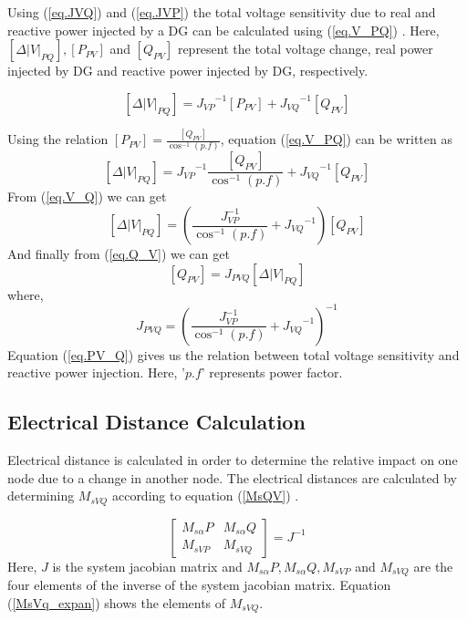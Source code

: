 Using (\ref{eq.JVQ}) and (\ref{eq.JVP}) the total voltage sensitivity due to real and reactive power injected by a DG can be calculated using (\ref{eq.V_PQ}) \cite{Th_ali}. Here, $[\Delta|V|_{PQ}], [P_{PV}] $ and $[Q_{PV}]$ represent the total voltage change, real power injected by DG and reactive power injected by DG, respectively.

\begin{equation}\label{eq.V_PQ}
[\Delta|V|_{PQ}] ={ J_{VP}}^{-1} [P_{PV}]+{ J_{VQ}}^{-1} [Q_{PV}]
\end{equation}

Using the relation $[P_{PV}] = \frac{[Q_{PV}]}{\cos^{-1}(p.f)}$, equation (\ref{eq.V_PQ}) can be written as
\begin{equation}\label{eq.V_Q}
 [\Delta|V|_{PQ}] ={ J_{VP}}^{-1}\frac{[Q_{PV}]}{\cos^{-1}(p.f)} +{ J_{VQ}}^{-1} [Q_{PV}]
\end{equation}
From (\ref{eq.V_Q}) we can get
\begin{equation}\label{eq.Q_V}
 [\Delta|V|_{PQ}] =( \frac{J_{VP}^{-1}}{\cos^{-1}(p.f)} +{ J_{VQ}}^{-1}) [Q_{PV}]
\end{equation}
And finally from (\ref{eq.Q_V}) we can get
\begin{equation}\label{eq.PV_Q}
 [Q_{PV}] = J_{PVQ} [\Delta|V|_{PQ}] 
\end{equation}
where,
\begin{equation}
J_{PVQ} = ( \frac{J_{VP}^{-1}}{\cos^{-1}(p.f)} +{ J_{VQ}}^{-1})^{-1}
\end{equation}
 Equation (\ref{eq.PV_Q}) gives us the relation between total voltage sensitivity and reactive power injection. Here, '$p.f$' represents power factor.

\subsection{Electrical Distance Calculation}\label{edc}
Electrical distance is calculated in order to determine the relative impact on one node due to a change in another node. The electrical distances are calculated by determining $M_{sVQ}$ according to equation (\ref{MsQV}) \cite{int1}.

\begin{equation}\label{MsQV}
\begin{bmatrix}
M_{s\alpha}P & M_{s\alpha}Q \\ 
M_{sVP} & M_{sVQ} 
\end{bmatrix} = J^{-1}
\end{equation}
 Here, $J$ is the system jacobian matrix and $M_{s\alpha}P, M_{s\alpha}Q, M_{sVP}$ and $M_{sVQ}$  are the four elements of the inverse of the system jacobian matrix. Equation (\ref{MsVq_expan}) shows the elements of $M_{sVQ}$. \cite{int1}

